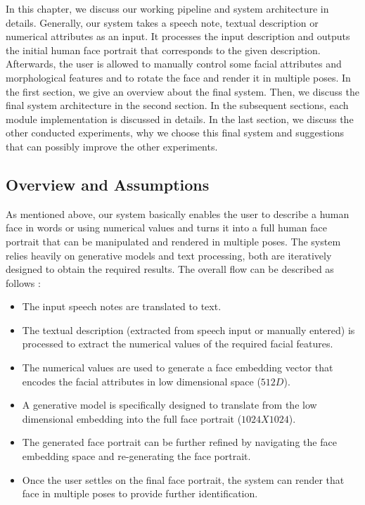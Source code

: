 In this chapter, we discuss our working pipeline and system architecture in details.  Generally, our system takes a speech note, textual description or numerical attributes as an input. It processes the input description and outputs the initial human face portrait that corresponds to the given description. Afterwards, the user is allowed to manually control some facial attributes and morphological features and to rotate the face and render it in multiple poses. In the first section, we give an overview about the final system. Then, we discuss the final system architecture in the second section. In the subsequent sections, each module implementation is discussed in details. In the last section, we discuss the other conducted experiments, why we choose this final system and suggestions that can possibly improve the other experiments.

\subsection{Overview and Assumptions}

As mentioned above, our system basically enables the user to describe a human face in words or using numerical values and turns it into a full human face portrait that can be manipulated and rendered in multiple poses. The system relies heavily on generative models and text processing, both are iteratively designed to obtain the required results. The overall flow can be described as follows :
\begin{itemize}
    \item The input speech notes are translated to text.
    \item The textual description (extracted from speech input or manually entered) is processed to extract the numerical values of the required facial features.
    \item The numerical values are used to generate a face embedding vector that encodes the facial attributes in low dimensional space ($512D$).
    \item A generative model is specifically designed to translate from the low dimensional embedding into the full face portrait ($1024X1024$).
    \item The generated face portrait can be further refined by navigating the face embedding space and re-generating the face portrait.
    \item Once the user settles on the final face portrait, the system can render that face in multiple poses to provide further identification.
\end{itemize}

